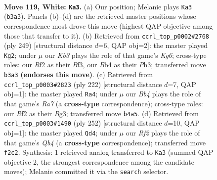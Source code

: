 \documentclass[11pt]{article}
\begin{document}
\begin{figure}[p]\centering
\begin{subfigure}{0.46\textwidth}\centering
\resizebox{\linewidth}{!}{%
\newchessgame
\chessboard[
  setfen={7k/8/7r/8/1B6/1K6/5R2/8 w - - 5 119},
  showmover=false,
  pgfstyle=straightmove, color=movearrow, markmove={b3-a3}
]}
\caption{}
\end{subfigure}\hfill
\begin{subfigure}{0.46\textwidth}\centering
\resizebox{\linewidth}{!}{%
\newchessgame
\chessboard[
  setfen={3R4/8/8/8/8/5bkp/3K4/8 b - - 2 125},
  showmover=false,
  pgfstyle=straightmove, color=movearrow, markmove={g3-g2}
]}
\caption{}
\end{subfigure}
\\[4pt]
\begin{subfigure}{0.46\textwidth}\centering
\resizebox{\linewidth}{!}{%
\newchessgame
\chessboard[
  setfen={2r2k2/R7/4p3/8/8/3K2B1/8/8 w - - 19 112},
  showmover=false,
  pgfstyle=straightmove, color=movearrow, markmove={a7-a4}
]}
\caption{}
\end{subfigure}\hfill
\begin{subfigure}{0.46\textwidth}\centering
\resizebox{\linewidth}{!}{%
\newchessgame
\chessboard[
  setfen={8/8/8/8/1Q6/3K4/k5r1/8 w - - 29 127},
  showmover=false,
  pgfstyle=straightmove, color=movearrow, markmove={b4-d4}
]}
\caption{}
\end{subfigure}
\caption{\textbf{Move 119, White: \texttt{Ka3}.} (a) Our position; Melanie plays \texttt{Ka3} (\texttt{b3a3}). Panels (b)--(d) are the retrieved master positions whose correspondence most drove this move (highest QAP objective among those that transfer to it). (b) Retrieved from \texttt{ccrl\_top\_p0002\#2768} (ply 249) [structural distance $d$=6, QAP obj=2]: the master played \texttt{Kg2}; under $\mu$ our \emph{Kb3} plays the role of that game's \emph{Kg6}; cross-type roles: our \emph{R}f2 as their \emph{B}f3, our \emph{B}b4 as their \emph{P}h3; transferred move \texttt{b3a3} \textbf{(endorses this move)}. (c) Retrieved from \texttt{ccrl\_top\_p0003\#2823} (ply 222) [structural distance $d$=7, QAP obj=1]: the master played \texttt{Ra4}; under $\mu$ our \emph{Bb4} plays the role of that game's \emph{Ra7} (a \textbf{cross-type} correspondence); cross-type roles: our \emph{R}f2 as their \emph{B}g3; transferred move \texttt{b4a5}. (d) Retrieved from \texttt{ccrl\_top\_p0003\#1490} (ply 252) [structural distance $d$=10, QAP obj=1]: the master played \texttt{Qd4}; under $\mu$ our \emph{Rf2} plays the role of that game's \emph{Qb4} (a \textbf{cross-type} correspondence); transferred move \texttt{f2c2}. Synthesis: 1 retrieved analog transferred to \texttt{Ka3} (summed QAP objective 2, the strongest correspondence among the candidate moves); Melanie committed it via the \texttt{search} selector.}
\label{fig:thought-m236}
\end{figure}
\end{document}
